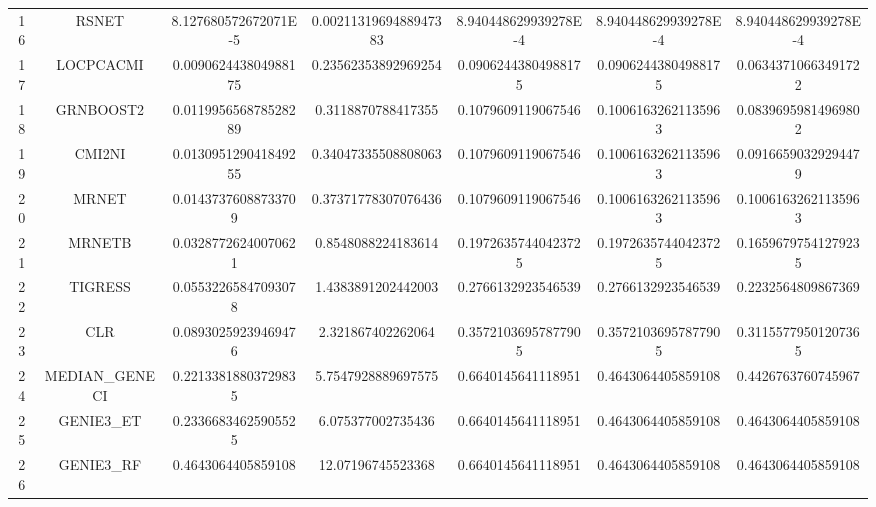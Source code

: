 \documentclass[a4paper,10pt]{article}
\begin{document}
\begin{landscape}
\begin{table}[!htp]
\begin{tabular}{ccccccc}
16&RSNET&8.127680572672071E-5&0.0021131969488947383&8.940448629939278E-4&8.940448629939278E-4&8.940448629939278E-4\\
17&LOCPCACMI&0.009062443804988175&0.23562353892969254&0.09062443804988175&0.09062443804988175&0.06343710663491722\\
18&GRNBOOST2&0.011995656878528289&0.3118870788417355&0.1079609119067546&0.10061632621135963&0.08396959814969802\\
19&CMI2NI&0.013095129041849255&0.34047335508808063&0.1079609119067546&0.10061632621135963&0.09166590329294479\\
20&MRNET&0.01437376088733709&0.37371778307076436&0.1079609119067546&0.10061632621135963&0.10061632621135963\\
21&MRNETB&0.03287726240070621&0.8548088224183614&0.19726357440423725&0.19726357440423725&0.16596797541279235\\
22&TIGRESS&0.05532265847093078&1.4383891202442003&0.2766132923546539&0.2766132923546539&0.2232564809867369\\
23&CLR&0.08930259239469476&2.321867402262064&0.35721036957877905&0.35721036957877905&0.31155779501207365\\
24&MEDIAN_GENECI&0.22133818803729835&5.7547928889697575&0.6640145641118951&0.4643064405859108&0.4426763760745967\\
25&GENIE3_ET&0.23366834625905525&6.075377002735436&0.6640145641118951&0.4643064405859108&0.4643064405859108\\
26&GENIE3_RF&0.4643064405859108&12.07196745523368&0.6640145641118951&0.4643064405859108&0.4643064405859108\\
\hline
\end{tabular}
\end{table}


\end{landscape}
\end{document}
